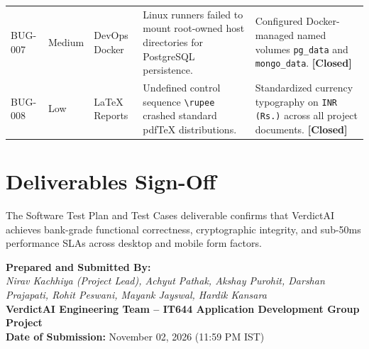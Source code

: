 \documentclass[11pt,a4paper]{article}
\begin{document}
\begin{table}[H]
\begin{tabular}{p{1.4cm} p{1.6cm} p{2.8cm} p{4.2cm} p{3.8cm}}
BUG-007 & Medium & DevOps Docker & Linux runners failed to mount root-owned host directories for PostgreSQL persistence. & Configured Docker-managed named volumes \texttt{pg\_data} and \texttt{mongo\_data}. \textbf{[Closed]} \\

BUG-008 & Low & LaTeX Reports & Undefined control sequence \texttt{\textbackslash rupee} crashed standard pdfTeX distributions. & Standardized currency typography on \texttt{INR (Rs.)} across all project documents. \textbf{[Closed]} \\

\bottomrule
\end{tabular}
\end{table}

\vspace{10pt}

\section{Deliverables Sign-Off}

The Software Test Plan and Test Cases deliverable confirms that VerdictAI achieves bank-grade functional correctness, cryptographic integrity, and sub-50ms performance SLAs across desktop and mobile form factors.

\vspace{12pt}
\noindent\textbf{Prepared and Submitted By:}\\
\textit{Nirav Kachhiya (Project Lead), Achyut Pathak, Akshay Purohit, Darshan Prajapati, Rohit Peswani, Mayank Jayswal, Hardik Kansara}\\
\textbf{VerdictAI Engineering Team -- IT644 Application Development Group Project}\\
\textbf{Date of Submission:} November 02, 2026 (11:59 PM IST)
\end{document}
